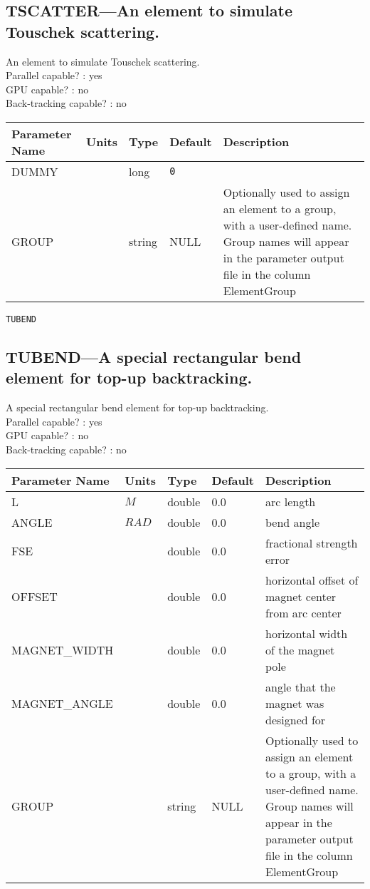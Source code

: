 \subsection{TSCATTER---An element to simulate Touschek scattering.}
An element to simulate Touschek scattering.
\\
Parallel capable? : yes\\
GPU capable? : no\\
Back-tracking capable? : no\\
\begin{tabular}{|l|l|l|l|p{\descwidth}|} \hline
Parameter Name & Units & Type & Default & Description \\ \hline 
DUMMY &  & long &  \verb|0| & \\ \hline 
GROUP &  & string & NULL & Optionally used to assign an element to a group, with a user-defined name.  Group names will appear in the parameter output file in the column ElementGroup  \\ \hline 
\end{tabular}

\newpage
\begin{center}{\Large\verb|TUBEND|}\end{center}
\subsection{TUBEND---A special rectangular bend element for top-up backtracking.}
A special rectangular bend element for top-up backtracking.
\\
Parallel capable? : yes\\
GPU capable? : no\\
Back-tracking capable? : no\\
\begin{tabular}{|l|l|l|l|p{\descwidth}|} \hline
Parameter Name & Units & Type & Default & Description \\ \hline 
L & $M$ & double &  0.0 & arc length  \\ \hline 
ANGLE & $RAD$ & double &  0.0 & bend angle  \\ \hline 
FSE &  & double &  0.0 & fractional strength error  \\ \hline 
OFFSET &  & double &  0.0 & horizontal offset of magnet center from arc center  \\ \hline 
MAGNET\_WIDTH &  & double &  0.0 & horizontal width of the magnet pole  \\ \hline 
MAGNET\_ANGLE &  & double &  0.0 & angle that the magnet was designed for  \\ \hline 
GROUP &  & string & NULL & Optionally used to assign an element to a group, with a user-defined name.  Group names will appear in the parameter output file in the column ElementGroup  \\ \hline 
\end{tabular}

